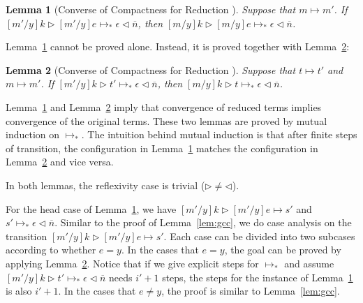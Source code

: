 \documentclass{article}
\newtheorem{lemma}{Lemma}
\newcommand{\RNum}[1]{\uppercase\expandafter{\romannumeral #1\relax}}
\begin{document}
\begin{lemma}[Converse of Compactness for Reduction \RNum{1}]\label{lem:B}
  Suppose that $m\longmapsto m'$.
  If $[m'/y]k\triangleright[m'/y]e\longmapsto_* \epsilon\triangleleft\overline{n}$,
  then $[m/y]k\triangleright[m/y]e\longmapsto_* \epsilon\triangleleft\overline{n}$.
\end{lemma}


Lemma~\ref{lem:B} cannot be proved alone. Instead, it is proved together with Lemma~\ref{lem:C}:


\begin{lemma}[Converse of Compactness for Reduction \RNum{2}]\label{lem:C}
  Suppose that $t\longmapsto t'$ and $m\longmapsto m'$.
  If $[m'/y]k\triangleright t'\longmapsto_* \epsilon\triangleleft\overline{n}$,
  then $[m/y]k\triangleright t\longmapsto_* \epsilon\triangleleft\overline{n}$.
\end{lemma}

Lemma~\ref{lem:B} and Lemma~\ref{lem:C} imply that
convergence of reduced terms implies convergence of the original terms.
These two lemmas are  proved by mutual induction on $\longmapsto_*$.
The intuition behind mutual induction is that after finite steps of transition,
the configuration in Lemma~\ref{lem:B} matches the configuration in Lemma~\ref{lem:C}
and vice versa.

In both lemmas, the reflexivity case is trivial ($\triangleright\neq \triangleleft$).

For the head case of Lemma~\ref{lem:B},
we have $[m'/y]k\triangleright[m'/y]e\longmapsto s'$
and $s' \longmapsto_* \epsilon\triangleleft\overline{n}$.
Similar to the proof of Lemma~\ref{lem:gcc}, we do case analysis on
the transition $[m'/y]k\triangleright[m'/y]e\longmapsto s'$.
Each case can be divided into two subcases according to whether $e = y$.
In the cases that $e = y$, the goal can be proved by applying Lemma~\ref{lem:C}.
Notice that if we give explicit steps for $\longmapsto_*$
and assume $[m'/y]k\triangleright t'\longmapsto_* \epsilon\triangleleft\overline{n}$ needs $i' + 1$ steps,
the steps for the instance of Lemma~\ref{lem:B} is also $i' + 1$.
In the cases that $e \neq y$, the proof is similar to Lemma~\ref{lem:gcc}.
\end{document}
